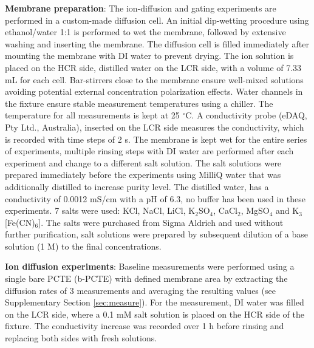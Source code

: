 \documentclass[journal=langd5,email=true, hyperref=true, keywords=false]{achemso}
\begin{document}
\vspace{1em}
\noindent
\textbf{Membrane preparation}: The ion-diffusion and gating experiments are
performed in a custom-made diffusion cell. An initial dip-wetting
procedure using ethanol/water 1:1 is performed to wet the membrane,
followed by extensive washing and inserting the membrane. The
diffusion cell is filled immediately after mounting the membrane with
DI water to prevent drying. The ion solution is placed on the HCR
side, distilled water on the LCR side, with a volume of 7.33 mL for
each cell. Bar-stirrers close to the membrane ensure well-mixed
solutions avoiding potential external concentration polarization
effects. Water channels in the fixture ensure stable measurement
temperatures using a chiller. The temperature for all measurements is
kept at 25 $^{\circ}$C. A conductivity probe (eDAQ, Pty Ltd.,
Australia), inserted on the LCR side measures the conductivity, which
is recorded with time steps of 2 s. The membrane is kept wet for the
entire series of experiments, multiple rinsing steps with DI water are
performed after each experiment and change to a different salt
solution. The salt solutions were prepared immediately before the
experiments using MilliQ water that was additionally distilled to
increase purity level. The distilled water, has a conductivity of
0.0012 mS/cm with a pH of 6.3, no buffer has been used in these
experiments. 7 salts were used: KCl, NaCl, LiCl, K$_{2}$SO$_{4}$,
CaCl$_{2}$, MgSO$_{4}$ and K$_{3}$[Fe(CN)$_{6}$]. The salts were
purchased from Sigma Aldrich and used without further purification,
salt solutions were prepared by subsequent dilution of a base solution
(1 M) to the final concentrations.

\vspace{1em}
\noindent
\textbf{Ion diffusion experiments}: { Baseline measurements were
performed using a single bare PCTE (b-PCTE) with defined membrane area} by extracting the diffusion rates
of 3 measurements and averaging the resulting values (see
Supplementary Section \ref{sec:measure}). For the measurement, DI water was filled on
the LCR side, where a 0.1 mM salt solution is placed on the HCR side
of the fixture. The conductivity increase was recorded over 1 h before
rinsing and replacing both sides with fresh solutions.
\end{document}

